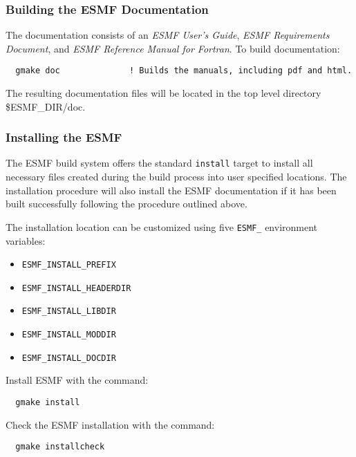 \subsubsection{Building the ESMF Documentation}
\label{BuildDocumentation}

The documentation consists of an {\it ESMF User's Guide}, 
{\it ESMF Requirements Document}, and 
{\it ESMF Reference Manual for Fortran}.  
\noindent To build documentation:
\begin{verbatim}
  gmake doc              ! Builds the manuals, including pdf and html.
\end{verbatim}

\noindent The resulting documentation files will be
located in the top level directory \${ESMF\_DIR}/doc.


\subsubsection{Installing the ESMF}
\label{InstallESMF}

The ESMF build system offers the standard {\tt install} target to install all
necessary files created during the build process into user specified locations.
The installation procedure will also install the ESMF documentation if it has
been built successfully following the procedure outlined above.

The installation location can be customized using five {\tt ESMF\_} environment
variables:
\begin{itemize}
\item {\tt ESMF\_INSTALL\_PREFIX}
\item {\tt ESMF\_INSTALL\_HEADERDIR}
\item {\tt ESMF\_INSTALL\_LIBDIR}
\item {\tt ESMF\_INSTALL\_MODDIR}
\item {\tt ESMF\_INSTALL\_DOCDIR}
\end{itemize}

Install ESMF with the command:
\begin{verbatim}
  gmake install
\end{verbatim}

Check the ESMF installation with the command:
\begin{verbatim}
  gmake installcheck
\end{verbatim}
